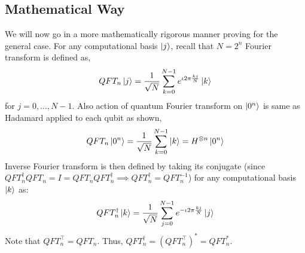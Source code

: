 \subsection{Mathematical Way}
We will now go in a more mathematically rigorous manner proving for the general case.
For any computational basis $\ket{j}$, recall that $N=2^n$ Fourier transform is defined as,
\[
QFT_n\ket{j}=\frac{1}{\sqrt{N}}\sum_{k=0}^{N-1} e^{\iota 2\pi \frac{kj}{N}}\ket{k}
\]
for $j=0,\ldots,N-1$. Also action of quantum Fourier transform on $\ket{0^n}$ is same as Hadamard applied to each qubit as shown,
\[
QFT_n\ket{0^n}=\frac{1}{\sqrt{N}}\sum_{k=0}^{N-1}\ket{k}=H^{\otimes n}\ket{0^n}
\]
Inverse Fourier transform is then defined by taking its conjugate (since $QFT_n^{\dagger}QFT_n=I=QFT_nQFT_n^{\dagger} \implies QFT_n^{\dagger}=QFT_n^{-1}$) for any computational basis $\ket{k}$ as:
\begin{equation}
QFT_n^{\dagger}\ket{k}=\frac{1}{\sqrt{N}}\sum_{j=0}^{N-1}e^{-\iota 2\pi \frac{kj}{N}}\ket{j}
\label{eq:inv_qft}
\end{equation}
Note that $QFT_n^{\top}=QFT_n$. Thus, $QFT_n^{\dagger}=(QFT_n^\top)^*=QFT_n^*$.

